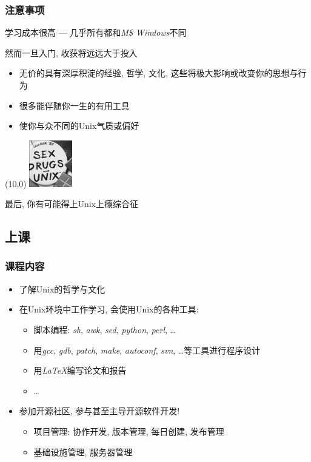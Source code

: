 \documentclass[compress]{beamer}
\begin{document}
\begin{frame}[t]
\frametitle{注意事项}
\alert{学习成本很高  --- 几乎所有都和\emph{M\$ Windows}不同}
\begin{block}{然而一旦入门, 收获将远远大于投入}
\begin{itemize}
    \item 无价的具有深厚积淀的经验, 哲学, 文化,
		这些将极大影响或改变你的思想与行为
    \item 很多能伴随你一生的有用工具
    \item 使你与众不同的Unix气质或偏好
\end{itemize}
\end{block}
\begin{textblock}{2}(10,0)
\includegraphics[height=0.8in]{unix_drug_sex.jpg}
\end{textblock}
\alert{最后, 你有可能得上Unix上瘾综合征}
\end{frame}

\subsection{上课}

\begin{frame}
\frametitle{课程内容}
\begin{itemize}
    \item 了解Unix的哲学与文化
    \item 在Unix环境中工作学习, 会使用Unix的各种工具:
    \begin{itemize}
		\item 脚本编程: \emph{sh}, \emph{awk}, \emph{sed},
            \emph{python}, \emph{perl}, \ldots
        \item 用\emph{gcc}, \emph{gdb}, \emph{patch}, \emph{make},
            \emph{autoconf}, \emph{svn}, \ldots 等工具进行程序设计
        \item 用\emph{\LaTeX}编写论文和报告
        \item \ldots
    \end{itemize}
    \item 参加开源社区, 参与甚至主导开源软件开发!
        \begin{itemize}
            \item 项目管理: 协作开发, 版本管理, 每日创建, 发布管理
            \item 基础设施管理, 服务器管理
    \end{itemize}
\end{itemize}
\end{frame}
\end{document}
